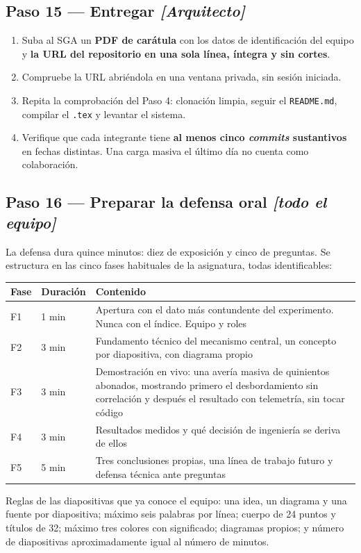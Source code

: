\documentclass[11pt,a4paper]{article}
\newcommand{\paso}[1]{\subsection{#1}}
\begin{document}
	\paso{Paso 15 --- Entregar \emph{[Arquitecto]}}
	
	\begin{enumerate}[leftmargin=*,itemsep=4pt]
		\item Suba al SGA un \textbf{PDF de carátula} con los datos de identificación del equipo y \textbf{la URL del repositorio en una sola línea, íntegra y sin cortes}.
		\item Compruebe la URL abriéndola en una ventana privada, sin sesión iniciada.
		\item Repita la comprobación del Paso 4: clonación limpia, seguir el \texttt{README.md}, compilar el \texttt{.tex} y levantar el sistema.
		\item Verifique que cada integrante tiene \textbf{al menos cinco \emph{commits} sustantivos} en fechas distintas. Una carga masiva el último día no cuenta como colaboración.
	\end{enumerate}
	
	\paso{Paso 16 --- Preparar la defensa oral \emph{[todo el equipo]}}
	
	La defensa dura quince minutos: diez de exposición y cinco de preguntas. Se estructura en las cinco fases habituales de la asignatura, todas identificables:
	
	\begin{center}
		\small
		\begin{tabular}{@{}p{1.1cm}p{3.5cm}p{10.3cm}@{}}
			\toprule
			\textbf{Fase} & \textbf{Duración} & \textbf{Contenido} \\
			\midrule
			F1 & 1 min & Apertura con el dato más contundente del experimento. Nunca con el índice. Equipo y roles \\
			F2 & 3 min & Fundamento técnico del mecanismo central, un concepto por diapositiva, con diagrama propio \\
			F3 & 3 min & Demostración en vivo: una avería masiva de quinientos abonados, mostrando primero el desbordamiento sin correlación y después el resultado con telemetría, sin tocar código \\
			F4 & 3 min & Resultados medidos y qué decisión de ingeniería se deriva de ellos \\
			F5 & 5 min & Tres conclusiones propias, una línea de trabajo futuro y defensa técnica ante preguntas \\
			\bottomrule
		\end{tabular}
	\end{center}
	
	Reglas de las diapositivas que ya conoce el equipo: una idea, un diagrama y una fuente por diapositiva; máximo seis palabras por línea; cuerpo de 24 puntos y títulos de 32; máximo tres colores con significado; diagramas propios; y número de diapositivas aproximadamente igual al número de minutos.
	
\end{document}
